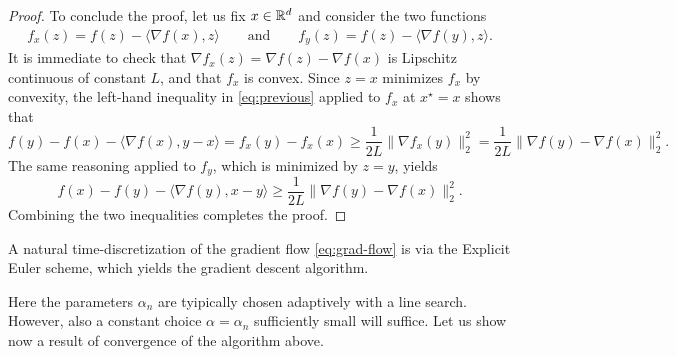 \begin{proof}
         To conclude the proof, let us fix $x\in \mathbb{R}^d$ and consider the two functions
         \begin{eqnarray}
             f_x(z) = f(z)-\langle \nabla f(x),z\rangle
             \qquad\text{and}\qquad
             f_y(z) = f(z)-\langle \nabla f(y),z\rangle.
         \end{eqnarray}
         It is immediate to check that $\nabla f_x(z) = \nabla f(z)-\nabla f(x)$ is Lipschitz continuous of constant $L$, and that $f_x$ is convex.
         Since $z=x$ minimizes $f_x$ by convexity, the left-hand inequality in \eqref{eq:previous} applied to $f_x$ at $x^\star =x$ shows that
         \begin{equation}
             f(y)-f(x)-\langle \nabla f(x),y-x \rangle = f_x(y)-f_x(x) \ge \frac{1}{2L}\|\nabla f_x(y)\|_2^2 = \frac{1}{2L}\|\nabla f(y)-\nabla f(x)\|_2^2.
         \end{equation}
         The same reasoning applied to $f_y$, which is minimized by $z=y$, yields
         \begin{equation}
             f(x)-f(y)-\langle \nabla f(y),x-y \rangle \ge \frac{1}{2L}\|\nabla f(y)-\nabla f(x)\|_2^2.
         \end{equation}
         Combining the two inequalities completes the proof.
     \end{proof}
 
     A natural time-discretization of the gradient flow \eqref{eq:grad-flow} is via the Explicit Euler scheme, which yields the gradient descent algorithm.
 
 
     Here the parameters $\alpha_n$ are tyipically chosen adaptively with a line search. However, also a constant choice $\alpha = \alpha_n$ suﬃciently small will suffice. Let us show now a result of convergence of the algorithm above.
 
 
